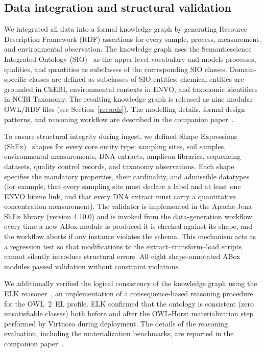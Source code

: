 \documentclass[11pt,a4paper]{article}
\begin{document}
\subsection{Data integration and structural validation}

We integrated all data into a formal knowledge graph by generating
Resource Description Framework (RDF) assertions for every sample,
process, measurement, and environmental observation. The knowledge
graph uses the Semanticscience Integrated Ontology (SIO)~\cite{sio}
as the upper-level vocabulary and models processes, qualities, and
quantities as subclasses of the corresponding SIO
classes. Domain-specific classes are defined as subclasses of SIO
entities; chemical entities are grounded in ChEBI, environmental
contexts in ENVO, and taxonomic identifiers in NCBI Taxonomy. The
resulting knowledge graph is released as nine modular OWL/RDF files
(see Section~\ref{records}). The modelling details, formal design
patterns, and reasoning workflow are described in the companion
paper~\cite{swj_companion}.

To ensure structural integrity during ingest, we defined Shape
Expressions (ShEx)~\cite{shex} shapes for every core entity type:
sampling sites, soil samples, environmental measurements, DNA
extracts, amplicon libraries, sequencing datasets, quality control
records, and taxonomy observations. Each shape specifies the
mandatory properties, their cardinality, and admissible datatypes
(for example, that every sampling site must declare a label and at
least one ENVO biome link, and that every DNA extract must carry a
quantitative concentration measurement). The validator is implemented
in the Apache Jena ShEx library (version 4.10.0) and is invoked from
the data-generation workflow: every time a new ABox module is produced
it is checked against its shape, and the workflow aborts if any
instance violates the schema. This mechanism acts as a regression
test so that modifications to the extract--transform--load scripts
cannot silently introduce structural errors. All eight shape-annotated
ABox modules passed validation without constraint violations.

We additionally verified the logical consistency of the knowledge
graph using the ELK reasoner~\cite{elk}, an implementation of a
consequence-based reasoning procedure for the OWL~2~EL profile. ELK
confirmed that the ontology is consistent (zero unsatisfiable
classes) both before and after the OWL-Horst materialization step
performed by Virtuoso during deployment. The details of the reasoning
evaluation, including the materialization benchmarks, are reported in
the companion paper~\cite{swj_companion}.
\end{document}
